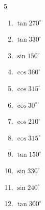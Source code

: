 \begin{multicols}{5}
\begin{enumerate}

  \item $\displaystyle \tan{270^\circ}$

        \phantom{$\displaystyle なし$}

  \item $\displaystyle \tan{330^\circ}$


  \item $\displaystyle \sin{150^\circ}$


  \item $\displaystyle \cos{360^\circ}$

        \phantom{$\displaystyle =1$}

  \item $\displaystyle \cos{315^\circ}$


  \item $\displaystyle \cos{30^\circ}$


\columnbreak %

  \item $\displaystyle \cos{210^\circ}$


  \item $\displaystyle \cos{315^\circ}$


  \item $\displaystyle \tan{150^\circ}$


  \item $\displaystyle \sin{330^\circ}$


  \item $\displaystyle \sin{240^\circ}$


  \item $\displaystyle \tan{300^\circ}$


\end{enumerate}
\end{multicols}
